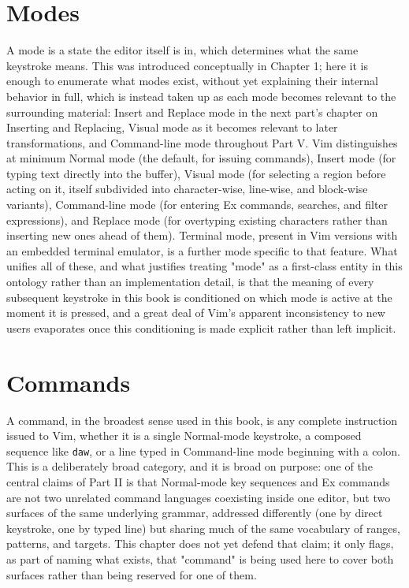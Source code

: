 \section{Modes}

A mode is a state the editor itself is in, which determines what the same keystroke means. This was introduced conceptually in Chapter 1; here it is enough to enumerate what modes exist, without yet explaining their internal behavior in full, which is instead taken up as each mode becomes relevant to the surrounding material: Insert and Replace mode in the next part's chapter on Inserting and Replacing, Visual mode as it becomes relevant to later transformations, and Command-line mode throughout Part V. Vim distinguishes at minimum Normal mode (the default, for issuing commands), Insert mode (for typing text directly into the buffer), Visual mode (for selecting a region before acting on it, itself subdivided into character-wise, line-wise, and block-wise variants), Command-line mode (for entering Ex commands, searches, and filter expressions), and Replace mode (for overtyping existing characters rather than inserting new ones ahead of them). Terminal mode, present in Vim versions with an embedded terminal emulator, is a further mode specific to that feature. What unifies all of these, and what justifies treating "mode" as a first-class entity in this ontology rather than an implementation detail, is that the meaning of every subsequent keystroke in this book is conditioned on which mode is active at the moment it is pressed, and a great deal of Vim's apparent inconsistency to new users evaporates once this conditioning is made explicit rather than left implicit.

\section{Commands}

A command, in the broadest sense used in this book, is any complete instruction issued to Vim, whether it is a single Normal-mode keystroke, a composed sequence like \texttt{daw}, or a line typed in Command-line mode beginning with a colon. This is a deliberately broad category, and it is broad on purpose: one of the central claims of Part II is that Normal-mode key sequences and Ex commands are not two unrelated command languages coexisting inside one editor, but two surfaces of the same underlying grammar, addressed differently (one by direct keystroke, one by typed line) but sharing much of the same vocabulary of ranges, patterns, and targets. This chapter does not yet defend that claim; it only flags, as part of naming what exists, that "command" is being used here to cover both surfaces rather than being reserved for one of them.

